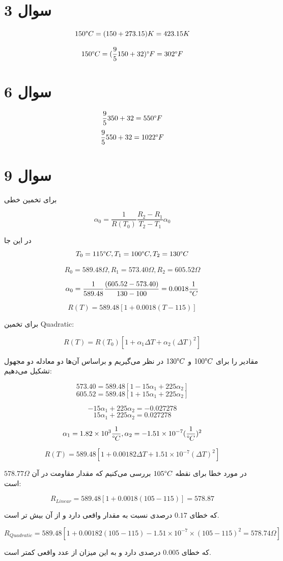 \documentclass[12pt]{article}
\begin{document}
\KashidaOff


\section*{سوال 3}

$$150 \degree C = (150 + 273.15) K= 423.15 K$$

$$150 \degree C = (\frac{9}{5}150 + 32) \degree F = 302 \degree F$$

\section*{سوال 6}
 
 $$\frac{9}{5} 350 + 32 = 550 \degree F$$
 $$\frac{9}{5} 550 + 32 = 1022 \degree F$$
 
 \section*{سوال 9}
 
 برای تخمین خطی
 
 $$\alpha_0 = \frac{1}{R(T_0)} \frac{R_2 - R_1}{T_2 -T_1} \alpha_0$$
 
 در این جا
 $$T_0 = 115 \degree C , T_1 = 100 \degree C , T_2 = 130 \degree C$$
 
 $$R_0 = 589.48 \Omega , R_1 = 573.40 \Omega , R_2 = 605.52 \Omega$$
 
 $$\alpha_0 = \frac{1}{589.48}\frac{(605.52 - 573.40)}{130 -100} = 0.0018 \frac{1}{\degree C}$$
 
 
 $$R(T) = 589.48[1+0.0018(T-115)]$$
 
 
 برای تخمین Quadratic:
 
 $$R(T) = R(T_0) [1+\alpha_1 \Delta T + \alpha_2 (\Delta T)^2]$$
 
 مقادیر را برای $100 \degree C$ و $130 \degree C$ در نظر می‌گیریم و براساس آن‌ها دو معادله دو مجهول تشکیل می‌دهیم:
 
 $$573.40 = 589.48 [1 -15 \alpha_1 + 225 \alpha_2]$$
 $$605.52 = 589.48[1 + 15 \alpha_1  +225 \alpha_2]$$
 
 
 $$-15 \alpha_1 + 225 \alpha_2 = -0.027278$$
 $$15 \alpha_1 + 225 \alpha_2 = 0.027278$$
 
 $$\alpha_1 = 1.82 \times 10^3 \frac{1}{\degree C} , \alpha_2 = -1.51 \times 10^{-7} (\frac{1}{\degree C})^2$$
 
 $$R(T) = 589.48[1+0.00182 \Delta T + 1.51 \times 10^{-7} (\Delta T)^2]$$
 
 در مورد خطا برای نقطه $105 \degree C$ بررسی می‌کنیم که مقدار مقاومت در آن
 $578.77 \Omega$
 است:
 
 $$R_{Linear} = 589.48[1 + 0.0018 (105 - 115)] =  578.87$$
 
 که خطای $0.17$ درصدی نسبت به مقدار واقعی دارد و از آن بیش تر است.
 
 $$R_{Quadratic} = 589.48[1 + 0.00182 (105 -115) -1.51  \times 10^{-7} \times (105 -115)^2 = 578.74 \Omega ]$$
 
 که خطای $0.005$ درصدی دارد و به این میزان از عدد واقعی کمتر است.
 
 
 
 
\end{document}
